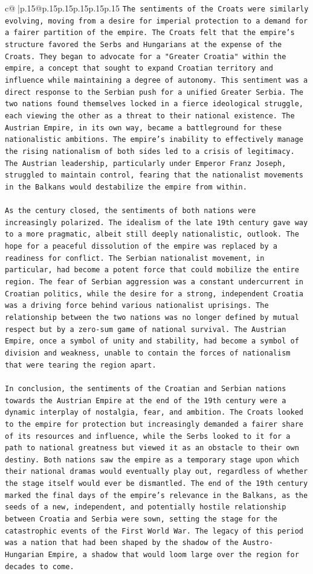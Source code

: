 \documentclass{article}
\begin{document}
{\begin{supertabular}{c@{$\;$}|p{.15\linewidth}@{}p{.15\linewidth}p{.15\linewidth}p{.15\linewidth}p{.15\linewidth}p{.15\linewidth}}
{{{\texttt{The sentiments of the Croats were similarly evolving, moving from a desire for imperial protection to a demand for a fairer partition of the empire. The Croats felt that the empire's structure favored the Serbs and Hungarians at the expense of the Croats. They began to advocate for a "Greater Croatia" within the empire, a concept that sought to expand Croatian territory and influence while maintaining a degree of autonomy. This sentiment was a direct response to the Serbian push for a unified Greater Serbia. The two nations found themselves locked in a fierce ideological struggle, each viewing the other as a threat to their national existence. The Austrian Empire, in its own way, became a battleground for these nationalistic ambitions. The empire's inability to effectively manage the rising nationalism of both sides led to a crisis of legitimacy. The Austrian leadership, particularly under Emperor Franz Joseph, struggled to maintain control, fearing that the nationalist movements in the Balkans would destabilize the empire from within.} \\
\\ 
\texttt{As the century closed, the sentiments of both nations were increasingly polarized. The idealism of the late 19th century gave way to a more pragmatic, albeit still deeply nationalistic, outlook. The hope for a peaceful dissolution of the empire was replaced by a readiness for conflict. The Serbian nationalist movement, in particular, had become a potent force that could mobilize the entire region. The fear of Serbian aggression was a constant undercurrent in Croatian politics, while the desire for a strong, independent Croatia was a driving force behind various nationalist uprisings. The relationship between the two nations was no longer defined by mutual respect but by a zero{-}sum game of national survival. The Austrian Empire, once a symbol of unity and stability, had become a symbol of division and weakness, unable to contain the forces of nationalism that were tearing the region apart.} \\
\\ 
\texttt{In conclusion, the sentiments of the Croatian and Serbian nations towards the Austrian Empire at the end of the 19th century were a dynamic interplay of nostalgia, fear, and ambition. The Croats looked to the empire for protection but increasingly demanded a fairer share of its resources and influence, while the Serbs looked to it for a path to national greatness but viewed it as an obstacle to their own destiny. Both nations saw the empire as a temporary stage upon which their national dramas would eventually play out, regardless of whether the stage itself would ever be dismantled. The end of the 19th century marked the final days of the empire's relevance in the Balkans, as the seeds of a new, independent, and potentially hostile relationship between Croatia and Serbia were sown, setting the stage for the catastrophic events of the First World War. The legacy of this period was a nation that had been shaped by the shadow of the Austro{-}Hungarian Empire, a shadow that would loom large over the region for decades to come.} \\
}}}
\end{supertabular}}
\end{document}
